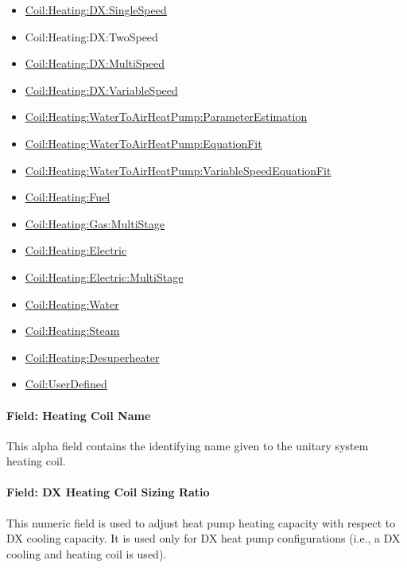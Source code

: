 \begin{itemize}
\item
  \hyperref[coilheatingdxsinglespeed]{Coil:Heating:DX:SingleSpeed}
\item
  Coil:Heating:DX:TwoSpeed
\item
  \hyperref[coilheatingdxmultispeed]{Coil:Heating:DX:MultiSpeed}
\item
  \hyperref[coilheatingdxvariablespeed]{Coil:Heating:DX:VariableSpeed}
\item
  \hyperref[coilheatingwatertoairheatpumpparameterestimation]{Coil:Heating:WaterToAirHeatPump:ParameterEstimation}
\item
  \hyperref[coilheatingwatertoairheatpumpequationfit]{Coil:Heating:WaterToAirHeatPump:EquationFit}
\item
  \hyperref[coilheatingwatertoairheatpumpvariablespeedequationfit]{Coil:Heating:WaterToAirHeat\hyperref[pumpvariablespeed]{Pump:VariableSpeed}EquationFit}
\item
  \hyperref[coilheatinggas-000]{Coil:Heating:Fuel}
\item
  \hyperref[coilheatinggasmultistage]{Coil:Heating:Gas:MultiStage}
\item
  \hyperref[coilheatingelectric]{Coil:Heating:Electric}
\item
  \hyperref[coilheatingelectricmultistage]{Coil:Heating:Electric:MultiStage}
\item
  \hyperref[coilheatingwater]{Coil:Heating:Water}
\item
  \hyperref[coilheatingsteam]{Coil:Heating:Steam}
\item
  \hyperref[coilheatingdesuperheater]{Coil:Heating:Desuperheater}
\item
  \hyperref[coiluserdefined]{Coil:UserDefined}
\end{itemize}

\paragraph{Field: Heating Coil Name}\label{field-heating-coil-name-002}

This alpha field contains the identifying name given to the unitary system heating coil.

\paragraph{Field: DX Heating Coil Sizing Ratio}\label{field-dx-heating-coil-sizing-ratio}

This numeric field is used to adjust heat pump heating capacity with respect to DX cooling capacity. It is used only for DX heat pump configurations (i.e., a DX cooling and heating coil is used).

